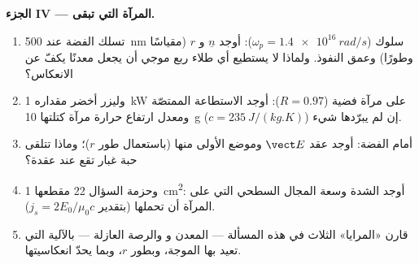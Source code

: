 \begin{problem}
\medskip
\noindent\textbf{الجزء IV --- المرآة التي تبقى.}
\begin{enumerate}[resume]
  \item تسلك الفضة عند \qty{500}{nm} سلوك  ($\omega_p = \qty{1.4e16}{rad/s}$):
        أوجد $\underline n$ و $r$ (مقياسًا وطورًا) وعمق النفوذ. ولماذا لا يستطيع أي
        طلاء ربع موجي أن يجعل معدنًا يكفّ عن الانعكاس؟
  \item وليزر أخضر مقداره \qty{1}{kW} على مرآة فضية ($R = 0.97$): أوجد الاستطاعة
        الممتصّة ومعدل ارتفاع حرارة مرآة كتلتها \qty{10}{g}
        ($c = \qty{235}{J/(kg.K)}$) إن لم يبرّدها شيء.
  \item {} أمام الفضة: أوجد  عقد
        $\vect E$ وموضع الأولى منها (باستعمال طور $r$)؛
        وماذا تتلقى حبة غبار تقع عند عقدة؟
  \item وحزمة السؤال 22 مقطعها \qty{1}{cm^2}: أوجد الشدة وسعة
        المجال  السطحي التي على المرآة أن
        تحملها (بتقدير  $j_s = 2E_0/\mu_0c$).
  \item قارن «المرايا» الثلاث في هذه المسألة --- المعدن و
         والرصة العازلة --- بالآلية التي تعيد بها
        الموجة، وبطور $r$، وبما يحدّ
        انعكاسيتها.
\end{enumerate}
\end{problem}
